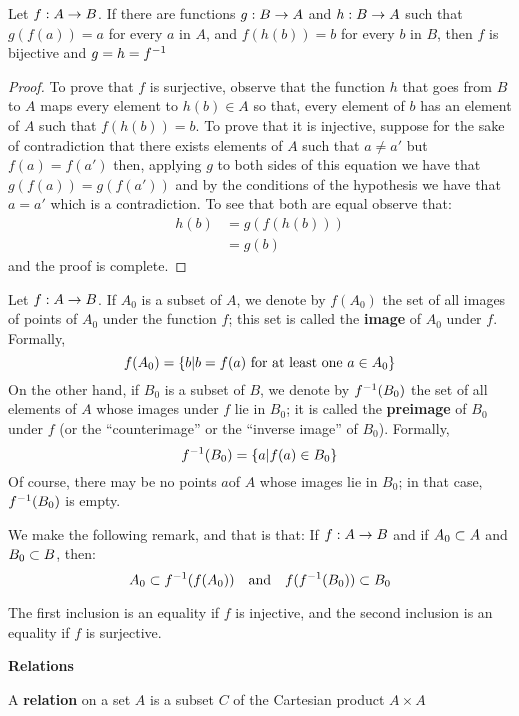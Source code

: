 \begin{lem}
	Let $f : A \rightarrow B $. If there are functions $ g : B \rightarrow A $ and $ h : B \rightarrow A $ such that $ g(f(a)) = a $ for every $a$ in $A$, and $f(h(b)) = b$ for every $b$ in $B$, then $f$ is bijective and $ g = h= f^{-1} $
\end{lem}
\begin{proof}
	To prove that $f$ is surjective, observe that the function $h$ that goes from $B$ to $A$ maps every element to $h(b) \in A$ so that, every element of $b$ has an element of $A$ such that $ f(h(b)) = b$. To prove that it is injective, suppose for the sake of contradiction that there exists elements of $A$ such that $ a \neq a' $ but $f(a) = f(a') $ then, applying $g$ to both sides of this equation we have that $ g(f(a)) = g(f(a')) $ and by the conditions of the hypothesis we have that $a = a'$ which is a contradiction. To see that both are equal observe that:
	\begin{align*}
	h(b) &= g(f(h(b))) \\
		 &= g(b)		
	\end{align*}
	and the proof is complete.
\end{proof}
\begin{defn}
	Let $ f : A \rightarrow B $. If $A_0$ is a subset of $A$, we denote by $f(A_0)$ the set of all images of points of $A_0$ under the function $f$; this set is called the \textbf{image} of $A_0$ under $f$. Formally,
	\[ f(A_0) = \left\lbrace b | b = f(a) \textrm{ for at least one } a \in A_0 \right\rbrace \]
	On the other hand, if $ B_0 $  is a subset of $B$, we denote by $f^{-1}(B_0) $ the set of all elements of $A$ whose images under $f$ lie in $B_0$; it is called the \textbf{preimage} of $B_0$ under $f$ (or the ``counterimage'' or the ``inverse image'' of $B_0$). Formally,
	\[ f^{-1}(B_0) = \left\lbrace a | f(a) \in B_0 \right\rbrace \]
	Of course, there may be no points $a$of $A$ whose images lie in $ B_0 $; in that case, $f^{-1} (B_0) $ is empty.
	
\end{defn}

We make the following remark, and that is that: If $ f : A \rightarrow B $  and if $A_0 \subset A$ and $B_0 \subset B$, then:
\[ A_0 \subset f^{-1}(f(A_0)) \quad \textrm{and} \quad f(f^{-1}(B_0)) \subset B_0 \]

The first inclusion is an equality if $f$ is injective, and the second inclusion is an equality if $f$ is surjective.

\textbf{Relations}

\begin{defn}
	A \textbf{relation} on a set $A$ is a subset $C$ of the Cartesian product $A \times A$ 
\end{defn}

